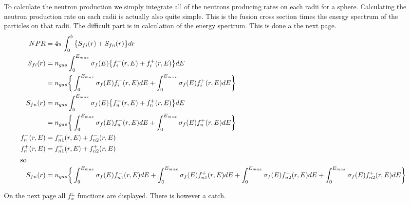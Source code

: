 \documentclass[a3]{book}
\begin{document}
To calculate the neutron production we simply integrate all of the neutrons producing rates on each radii for a sphere. Calculating the neutron production rate on each radii is actually also quite simple. This is the fusion cross section times the energy spectrum of the particles on that radii. The difficult part is in calculation of the energy spectrum. This is done a the next page.
\begin{align}
	NPR 		& = 4 \pi 			\int_0^b \big\{S_{fi}(r) + S_{fn}(r) \big\} dr 			\\
% 
\label{Sfi}
	S_{fi}(r)		& = n_{gas} 			\int_0^{E_{max}}		\sigma_f(E)  	\big\{ 	f_i^-(r, E) 		+ f_i^+(r, E) \big\} dE		\\
				& = n_{gas} \bigg\{ 		\int_0^{E_{max}}		\sigma_f(E)				f_i^-(r, E) dE 	+ \int_0^{E_{max}} \sigma_f(E) f_i^+(r,E) dE \bigg\} \\
%
	S_{fn}(r)	& = n_{gas} 			\int_0^{E_{max}} 		\sigma_f(E)	\big\{	 f_n^-(r, E) 		+ f_n^+(r, E) \big\} dE		\\
				& = n_{gas} \bigg\{	 	\int_0^{E_{max}}		\sigma_f(E)			 f_n^-(r, E) dE 	+ \int_0^{E_{max}} \sigma_f(E) f_n^+(r,E) dE \bigg\} \\
%
	f_n^-(r, E)	& =				f_{n1}^-(r, E) + f_{n2}^-(r, E) \\
	f_n^+(r, E)	& =				f_{n1}^+(r, E) + f_{n2}^+(r, E) \\
%
\intertext{so}
	S_{fn}(r)		& = n_{gas} \bigg\{ \int_0^{E_{max}} \sigma_f(E) f_{n1}^-(r,E) dE + \int_0^{E_{max}} \sigma_f(E) f_{n1}^+(r,E) dE + \int_0^{E_{max}} \sigma_f(E) f_{n2}^-(r,E) dE + \int_0^{E_{max}} \sigma_f(E) f_{n2}^+(r,E) dE \bigg\} 
\end{align}



On the next page all $f^\pm_x$ functions are displayed. There is however a catch. 
\end{document}
